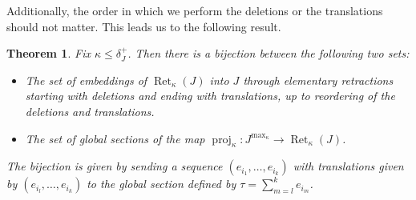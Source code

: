\documentclass[10pt,a4paper]{amsart}
\newtheorem{theorem}{Theorem}[section]
\newcommand{\delplus}{\delta_J^+}
\DeclareMathOperator{\proj}{proj}              %
\newcommand{\kproj}{\proj_{\kappa}}            %
\DeclareMathOperator{\Ret}{Ret}                %
\newcommand{\RetK}{\Ret_{\kappa}}              %
\newcommand{\Jmax}{J^{\max_{\kappa}}}
\begin{document}
Additionally, the order in which we perform the deletions or the translations should not matter. This leads us to the following result.
\begin{theorem} \label{theorem:sections_and_embedded_minors}
    Fix $\kappa \leq \delplus$. Then there is a bijection between the following two sets:
    \begin{itemize}        
        \item The set of embeddings of $\RetK(J)$ into $J$ through elementary retractions starting with deletions and ending with translations, up to reordering of the deletions and translations.
        \item The set of global sections of the map $\kproj:\Jmax \to \RetK(J)$.
    \end{itemize}
    The bijection is given by sending a sequence $(e_{i_1},\dots,e_{i_k})$ with translations given by $(e_{i_l},\dots,e_{i_k})$ to the global section defined by $\tau = \sum_{m=l}^k e_{i_m}$.
\end{theorem}
\end{document}
